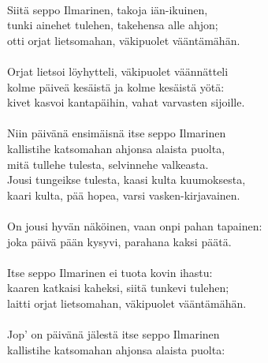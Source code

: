                                                                   \\
Siitä seppo Ilmarinen, takoja iän-ikuinen,                        \\
tunki ainehet tulehen, takehensa alle ahjon;                      \\
otti orjat lietsomahan, väkipuolet vääntämähän.                   \\
                                                                  \\
Orjat lietsoi löyhytteli, väkipuolet väännätteli                  \\
kolme päiveä kesäistä ja kolme kesäistä yötä:                     \\
kivet kasvoi kantapäihin, vahat varvasten sijoille.               \\
                                                                  \\
Niin päivänä ensimäisnä itse seppo Ilmarinen                      \\
kallistihe katsomahan ahjonsa alaista puolta,                     \\
mitä tullehe tulesta, selvinnehe valkeasta.                       \\
Jousi tungeikse tulesta, kaasi kulta kuumoksesta,                 \\
kaari kulta, pää hopea, varsi vasken-kirjavainen.                 \\
                                                                  \\
On jousi hyvän näköinen, vaan onpi pahan tapainen:                \\
joka päivä pään kysyvi, parahana kaksi päätä.                     \\
                                                                  \\
Itse seppo Ilmarinen ei tuota kovin ihastu:                       \\
kaaren katkaisi kaheksi, siitä tunkevi tulehen;                   \\
laitti orjat lietsomahan, väkipuolet vääntämähän.                 \\
                                                                  \\
Jop' on päivänä jälestä itse seppo Ilmarinen                      \\
kallistihe katsomahan ahjonsa alaista puolta:                     \\

